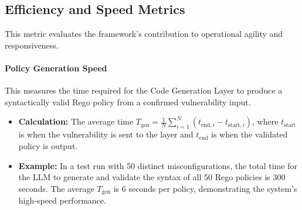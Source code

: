 \subsection*{Efficiency and Speed Metrics}
This metric evaluates the framework's contribution to operational agility and responsiveness.

\paragraph{Policy Generation Speed} This measures the time required for the Code Generation Layer to produce a syntactically valid Rego policy from a confirmed vulnerability input.
\begin{itemize}
    \item \textbf{Calculation:} The average time \( T_{\text{gen}} = \frac{1}{N} \sum_{i=1}^{N} (t_{\text{end},i} - t_{\text{start},i}) \), where \( t_{\text{start}} \) is when the vulnerability is sent to the layer and \( t_{\text{end}} \) is when the validated policy is output.
    \item \textbf{Example:} In a test run with 50 distinct misconfigurations, the total time for the LLM to generate and validate the syntax of all 50 Rego policies is 300 seconds. The average \( T_{\text{gen}} \) is 6 seconds per policy, demonstrating the system's high-speed performance.
\end{itemize}



